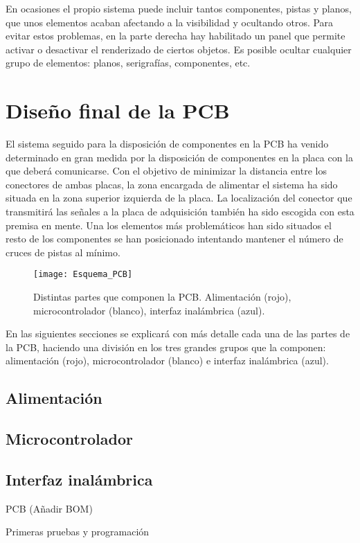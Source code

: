 En ocasiones el propio sistema puede incluir tantos componentes, pistas y planos, que unos elementos acaban afectando a la visibilidad y ocultando otros. Para evitar estos problemas, en la parte derecha hay habilitado un panel que permite activar o desactivar el renderizado de ciertos objetos. Es posible ocultar cualquier grupo de elementos: planos, serigrafías, componentes, etc.
 
\section{Diseño final de la PCB\label{sec:PCB_final}}

El sistema seguido para la disposición de componentes en la PCB ha venido determinado en gran medida por la disposición de componentes en la placa con la que deberá comunicarse. Con el objetivo de minimizar la distancia entre los conectores de ambas placas, la zona encargada de alimentar el sistema ha sido situada en la zona superior izquierda de la placa. La localización del conector que transmitirá las señales a la placa de adquisición también ha sido escogida con esta premisa en mente. Una los elementos más problemáticos han sido situados el resto de los componentes se han posicionado intentando mantener el número de cruces de pistas al mínimo.

\begin{figure} [h]
    \centering
    \texttt{[image: Esquema\_PCB]}
    \caption{Distintas partes que componen la PCB. Alimentación (rojo), microcontrolador (blanco), interfaz inalámbrica (azul).}
    \label{fig:Esquema_PCB}
\end{figure}

En las siguientes secciones se explicará con más detalle cada una de las partes de la PCB, haciendo una división en los tres grandes grupos que la componen: alimentación (rojo), microcontrolador (blanco) e interfaz inalámbrica (azul).

\subsection{Alimentación\label{sec:PCB_alimentacion}}

\subsection{Microcontrolador\label{sec:PCB_alimentacion}}

\subsection{Interfaz inalámbrica\label{sec:PCB_alimentacion}}



	PCB (Añadir BOM)
	
	Primeras pruebas y programación
	
